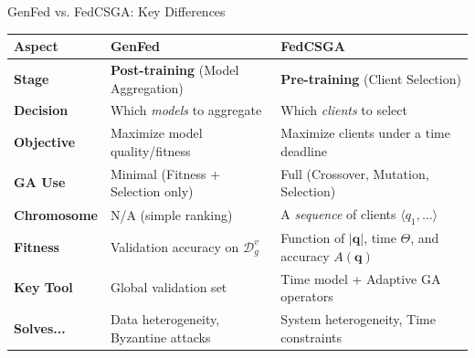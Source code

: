 \documentclass{beamer}
\begin{document}
\begin{frame}{GenFed vs. FedCSGA: Key Differences}
\begin{table}
\centering
\tiny
\begin{tabular}{lll}
\toprule
\textbf{Aspect} & \textbf{\textcolor{genfedblue}{GenFed}} & \textbf{\textcolor{fedcsgaorange}{FedCSGA}} \\
\midrule
\textbf{Stage} & \textbf{Post-training} (Model Aggregation) & \textbf{Pre-training} (Client Selection) \\
\textbf{Decision} & Which \textit{models} to aggregate & Which \textit{clients} to select \\
\textbf{Objective} & Maximize model quality/fitness & Maximize clients under a time deadline \\
\textbf{GA Use} & Minimal (Fitness + Selection only) & Full (Crossover, Mutation, Selection) \\
\textbf{Chromosome} & N/A (simple ranking) & A \textit{sequence} of clients $\langle q_1, \ldots \rangle$ \\
\textbf{Fitness} & Validation accuracy on $\mathcal{D}_g^v$ & Function of $|\mathbf{q}|$, time $\Theta$, and accuracy $A(\mathbf{q})$ \\
\textbf{Key Tool} & Global validation set & Time model + Adaptive GA operators \\
\textbf{Solves...} & Data heterogeneity, Byzantine attacks & System heterogeneity, Time constraints \\
\bottomrule
\end{tabular}
\end{table}
\end{frame}
\end{document}
